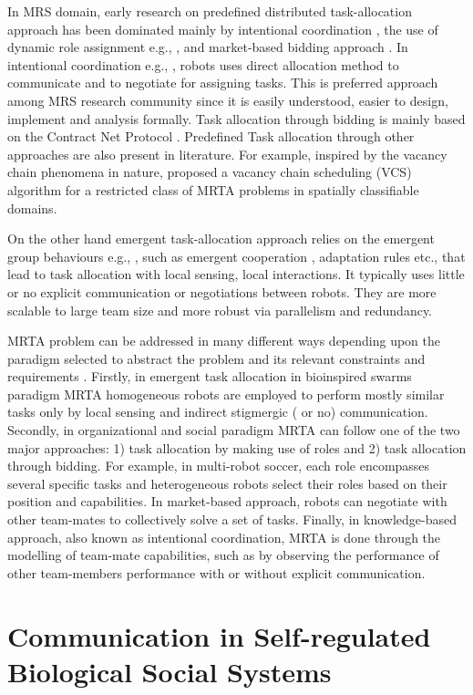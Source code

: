 In MRS domain, early research on predefined distributed task-allocation approach has been dominated mainly by intentional coordination \cite{Gerkey+2004,Parker1998}, the use of dynamic role assignment e.g., \cite{Chaimowicz2002}, and market-based bidding approach \cite{Dias+2006}. In intentional coordination e.g., \cite{Parker1998}, robots uses direct allocation method to communicate and to negotiate for assigning tasks. This is preferred approach among MRS research community since it is easily understood, easier to design, implement and analysis formally. Task allocation through bidding is mainly based on the Contract Net Protocol \cite{Davis1988+}. Predefined Task allocation through other approaches are also present in literature. For example, inspired by the vacancy chain phenomena in nature, \cite{Dahl+2003} proposed a vacancy chain scheduling (VCS) algorithm for a restricted class of MRTA problems in spatially classifiable domains.

On the other hand emergent task-allocation approach relies on the emergent group behaviours e.g., \cite{Kube+1993}, such as emergent cooperation \cite{Lerman+2006}, adaptation rules \cite{Liu+2007} etc., that lead to task allocation with local sensing, local interactions. It typically uses little or no explicit communication or negotiations between robots. They are more scalable to large team size and more robust via parallelism and redundancy.

MRTA problem can be addressed in many different ways depending upon the paradigm selected to abstract the problem and its relevant constraints and requirements \cite{Parker2008}. Firstly, in emergent task allocation in bioinspired swarms paradigm MRTA homogeneous robots are employed to perform mostly similar tasks only by local sensing and indirect stigmergic ( or no) communication. Secondly, in organizational and social paradigm MRTA can follow one of the two major approaches: 1) task allocation by making use of roles and 2) task allocation through bidding. For example, in multi-robot soccer, each role encompasses several specific tasks and heterogeneous robots select their roles based on their position and capabilities. In market-based approach, robots can negotiate with other team-mates to collectively solve a set of tasks. Finally, in knowledge-based approach, also known as intentional coordination, MRTA is done through the modelling of team-mate capabilities, such as by observing the performance of other team-members performance with or without explicit communication.
\section{Communication in Self-regulated Biological Social Systems}

